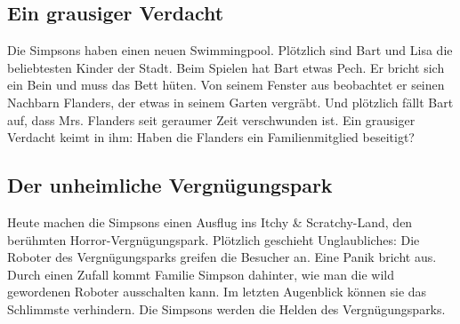 	
\subsection{Ein grausiger Verdacht}\label{1F22}
Die Simpsons haben einen neuen Swimmingpool. Plötzlich sind Bart und Lisa die beliebtesten Kinder der Stadt. Beim Spielen hat Bart etwas Pech. Er bricht sich ein Bein und muss das Bett hüten. Von seinem Fenster aus beobachtet er seinen Nachbarn Flanders, der etwas in seinem Garten vergräbt. Und plötzlich fällt Bart auf, dass Mrs. Flanders seit geraumer Zeit verschwunden ist. Ein grausiger Verdacht keimt in ihm: Haben die Flanders ein Familienmitglied beseitigt?

	
\subsection{Der unheimliche Vergnügungspark}\label{2F01}
Heute machen die Simpsons einen Ausflug ins Itchy \& Scratchy-Land, den be\-rühm\-ten Hor\-ror-Ver\-gnügungspark. Plötzlich geschieht Unglaubliches: Die Roboter des Vergnügungsparks greifen die Besucher an. Eine Panik bricht aus. Durch einen Zufall kommt Familie Simpson dahinter, wie man die wild gewordenen Roboter ausschalten kann. Im letzten Augenblick können sie das Schlimmste verhindern. Die Simpsons werden die Helden des Vergnügungsparks.

	
